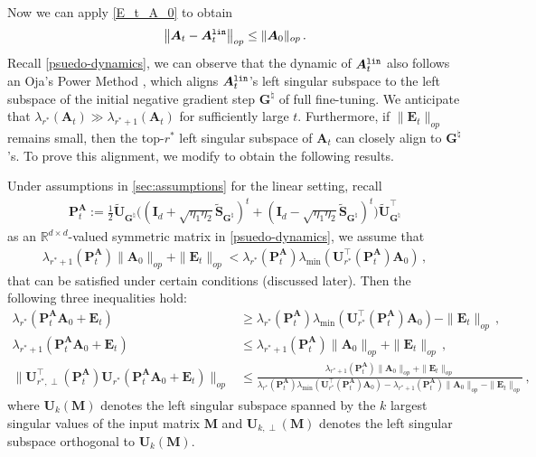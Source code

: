 Now we can apply \cref{E_t_A_0} to obtain
\[
\left\|\bm A_t -\bm A^{\tt lin}_t\right\|_{op} \leq \|\bm A_0\|_{op}\,.
\]
Recall \cref{psuedo-dynamics}, we can observe that the dynamic of $\bm A^{\tt lin}_t$ also follows an Oja's Power Method \citep{oja1982simplified}, which aligns $\bm A^{\tt lin}_t$'s left singular subspace to the left subspace of the initial negative gradient step ${\bm G}^{\natural}$ of full fine-tuning. We anticipate that $\lambda_{r^*}\left(\bm A_t\right)\gg\lambda_{r^*+1}\left(\bm A_t\right)$ for sufficiently large $t$. Furthermore, if $\|\bm E_t\|_{op}$ remains small, then the top-$r^*$ left singular subspace of $\bm A_t$ can closely align to ${\bm G}^{\natural}$'s. To prove this alignment, we modify \citet[Lemma 8.3]{stoger2021small} to obtain the following results.
\begin{lemma}
\label{Mahdi}
Under assumptions in \cref{sec:assumptions} for the linear setting, recall
\begin{align*}
    \bm P_t^{\bm A}:=\frac{1}{2}\widetilde{\bm U}_{\bm G^\natural}\bigg(\left(\bm I_d + \sqrt{\eta_1 \eta_2}\widetilde{\bm S}_{\bm G^\natural}\right)^t + \left(\bm I_d - \sqrt{\eta_1 \eta_2}\widetilde{\bm S}_{\bm G^\natural}\right)^t\bigg)\widetilde{\bm U}_{\bm G^\natural}^{\!\top}
\end{align*}
as an $\mathbb{R}^{d\times d}$-valued symmetric matrix in \cref{psuedo-dynamics}, we assume that
    \begin{align*}
        \lambda_{r^*+1}(\bm P_t^{\bm A})\|\bm A_0\|_{op}+\|\bm E_t\|_{op} < \lambda_{r^*}(\bm P_t^{\bm A})\lambda_{\min}(\bm U^{\!\top}_{r^*}(\bm P_t^{\bm A}) \bm A_0)\, ,
    \end{align*}
    that can be satisfied under certain conditions (discussed later).
    Then the following three inequalities hold:
    \begin{align}
        \lambda_{r^*}(\bm P_t^{\bm A}\bm A_0+\bm E_t) & \geq \lambda_{r^*}(\bm P_t^{\bm A})\lambda_{\min}(\bm U^{\!\top}_{r^*}(\bm P_t^{\bm A}) \bm A_0)-\|\bm E_t\|_{op}\,, \label{eq:rP} \\
        \lambda_{r^*+1}(\bm P_t^{\bm A}\bm A_0+\bm E_t) & \leq \lambda_{r^*+1}(\bm P_t^{\bm A})\|\bm A_0\|_{op} + \|\bm E_t\|_{op}\,, \label{eq:r1P} \\
        \|\bm U^{\!\top}_{r^*,\perp}(\bm P_t^{\bm A})\bm U_{r^*}(\bm P_t^{\bm A}\bm A_0+\bm E_t)\|_{op} & \leq \frac{\lambda_{r^*+1}(\bm P_t^{\bm A})\|\bm A_0\|_{op} + \|\bm E_t\|_{op}}{\lambda_{r^*}(\bm P_t^{\bm A})\lambda_{\min}(\bm U^{\!\top}_{r^*}(\bm P_t^{\bm A}) \bm A_0) - \lambda_{r^*+1}(\bm P_t^{\bm A})\|\bm A_0\|_{op}-\|\bm E_t\|_{op}}\,, \label{eq:angle}
    \end{align}
    where $\bm U_k(\bm M)$ denotes the left singular subspace spanned by the $k$ largest singular values of the input matrix $\bm M$ and $\bm U_{k,\perp}(\bm M)$ denotes the left singular subspace orthogonal to $\bm U_{k}\left(\bm{M}\right)$.
\end{lemma}
